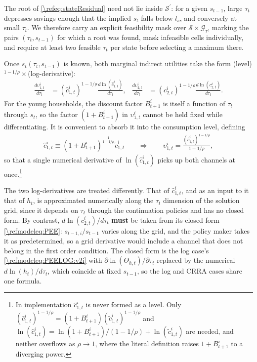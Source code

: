 The root of \eqref{\refeq:stateResidual} need not lie inside $\mathcal{S}^{\prime}$: for a given $s_{t-1}$, large $\tau_t$ depresses savings enough that the implied $s_t$ falls below $l_s$, and conversely at small $\tau_t$. We therefore carry an explicit feasibility mask over $\mathcal{S}\times\mathcal{G}_{\tau}$, marking the pairs $(\tau_t, s_{t-1})$ for which a root was found, mask infeasible cells individually, and require at least two feasible $\tau_t$ per state before selecting a maximum there.

Once $s_t(\tau_t,s_{t-1})$ is known, both marginal indirect utilities take the form (level)$^{1-1/\rho}\times$(log-derivative):
\begin{subequations}\label{\refeq:PEEcrraTerms}
\begin{align}
    \frac{d\upsilon_{1,t}^i}{d\tau_t} &= \left(\hat{c}_{1,t}^i\right)^{1-1/\rho}\frac{d\ln\left(\hat{c}_{1,t}^i\right)}{d\tau_t}, &
    \frac{d\upsilon_{2,t}^i}{d\tau_t} &= \left(c_{2,t}^i\right)^{1-1/\rho}\frac{d\ln\left(c_{2,t}^i\right)}{d\tau_t}.
\end{align}
\end{subequations}
For the young households, the discount factor $B_{t+1}^i$ is itself a function of $\tau_t$ through $s_t$, so the factor $(1+B_{t+1}^i)$ in $\upsilon_{1,t}^i$ cannot be held fixed while differentiating. It is convenient to absorb it into the consumption level, defining
\begin{align}\label{\refeq:hatc1i}
    \hat{c}_{1,t}^i \equiv \left(1+B_{t+1}^i\right)^{\frac{1}{1-1/\rho}}\tilde{c}_{1,t}^i \qquad\Longrightarrow\qquad \upsilon_{1,t}^i = \frac{\left(\hat{c}_{1,t}^i\right)^{1-1/\rho}}{1-1/\rho},
\end{align}
so that a single numerical derivative of $\ln(\hat{c}_{1,t}^i)$ picks up both channels at once.\footnote{In implementation $\hat{c}_{1,t}^i$ is never formed as a level. Only $\left(\hat{c}_{1,t}^i\right)^{1-1/\rho} = \left(1+B_{t+1}^i\right)\left(\tilde{c}_{1,t}^i\right)^{1-1/\rho}$ and $\ln\left(\hat{c}_{1,t}^i\right) = \ln\left(1+B_{t+1}^i\right)/(1-1/\rho)+\ln\left(\tilde{c}_{1,t}^i\right)$ are needed, and neither overflows as $\rho\rightarrow 1$, where the literal definition raises $1+B_{t+1}^i$ to a diverging power.}

The two log-derivatives are treated differently. That of $\hat{c}_{1,t}^i$, and as an input to it that of $h_t$, is approximated numerically along the $\tau_t$ dimension of the solution grid, since it depends on $\tau_t$ through the continuation policies and has no closed form. By contrast, $d\ln(c_{2,t}^i)/d\tau_t$ \textbf{must} be taken from its closed form \eqref{\refmodeleq:PEE}: $s_{t-1,i}/s_{t-1}$ varies along the grid, and the policy maker takes it as predetermined, so a grid derivative would include a channel that does not belong in the first order condition. The closed form is the log case's \eqref{\refmodeleq:PEELOG:v2i} with $\partial\ln(\Theta_{h,t})/\partial\tau_t$ replaced by the numerical $d\ln(h_t)/d\tau_t$, which coincide at fixed $s_{t-1}$, so the log and CRRA cases share one formula.

